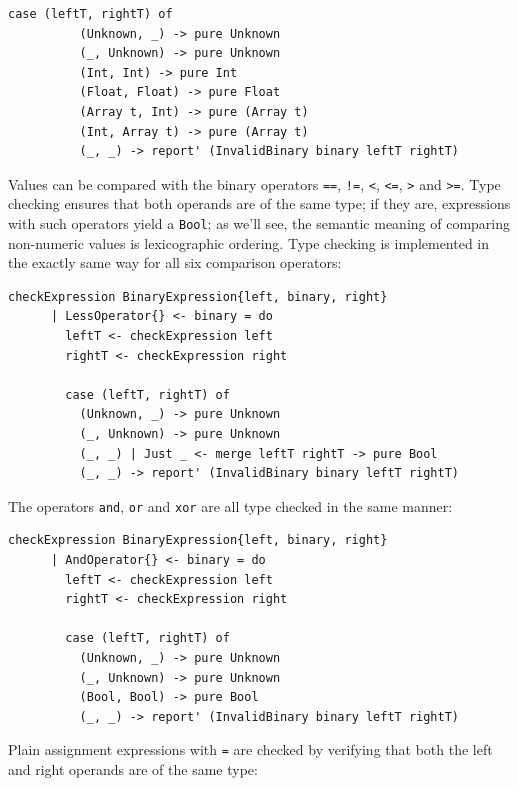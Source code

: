 \documentclass[UdineBachThesis,american,11pt]{PhdThesis}
\begin{document}
  \pagebreak

  \begin{Verbatim}[gobble=4,fontsize=\small]
        case (leftT, rightT) of
          (Unknown, _) -> pure Unknown
          (_, Unknown) -> pure Unknown
          (Int, Int) -> pure Int
          (Float, Float) -> pure Float
          (Array t, Int) -> pure (Array t)
          (Int, Array t) -> pure (Array t)
          (_, _) -> report' (InvalidBinary binary leftT rightT)
  \end{Verbatim}

  Values can be compared with the binary operators \mbox{\texttt{==}},
  \mbox{\texttt{!=}}, \texttt{<}, \mbox{\texttt{<=}}, \texttt{>} and
  \mbox{\texttt{>=}}. Type checking ensures that both operands are of the same
  type; if they are, expressions with such operators yield a
  \mbox{\texttt{Bool}}; as we'll see, the semantic meaning of comparing
  non-numeric values is lexicographic ordering. Type checking is implemented in
  the exactly same way for all six comparison operators:

  \begin{Verbatim}[gobble=4,fontsize=\small]
    checkExpression BinaryExpression{left, binary, right}
      | LessOperator{} <- binary = do
        leftT <- checkExpression left
        rightT <- checkExpression right

        case (leftT, rightT) of
          (Unknown, _) -> pure Unknown
          (_, Unknown) -> pure Unknown
          (_, _) | Just _ <- merge leftT rightT -> pure Bool
          (_, _) -> report' (InvalidBinary binary leftT rightT)
  \end{Verbatim}

  The operators \mbox{\texttt{and}}, \mbox{\texttt{or}} and \mbox{\texttt{xor}}
  are all type checked in the same manner:

  \begin{Verbatim}[gobble=4,fontsize=\small]
    checkExpression BinaryExpression{left, binary, right}
      | AndOperator{} <- binary = do
        leftT <- checkExpression left
        rightT <- checkExpression right

        case (leftT, rightT) of
          (Unknown, _) -> pure Unknown
          (_, Unknown) -> pure Unknown
          (Bool, Bool) -> pure Bool
          (_, _) -> report' (InvalidBinary binary leftT rightT)
  \end{Verbatim}

  Plain assignment expressions with \texttt{=} are checked by verifying that
  both the left and right operands are of the same type:
\end{document}
